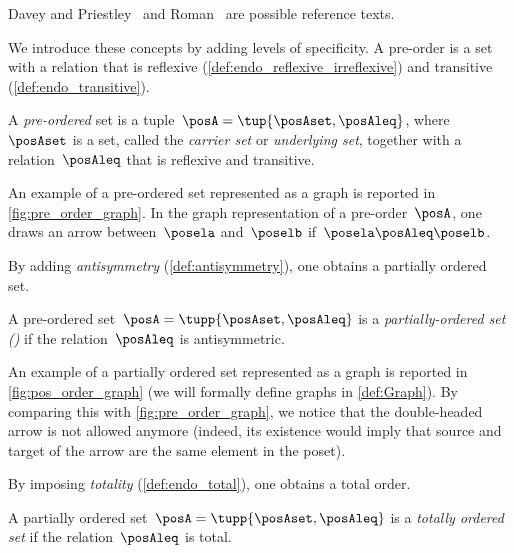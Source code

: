 Davey and Priestley~\cite{davey02} and Roman~\cite{roman08} are possible reference texts.

We introduce these concepts by adding levels of specificity.
A pre-order is a set with a relation that is reflexive (\cref{def:endo_reflexive_irreflexive}) and transitive (\cref{def:endo_transitive}).
\begin{ctdefinition}
    \label{def:preorder}
    A \emph{pre-ordered} set is a tuple~$\posA = \tup{\posAset,\posAleq}$, where~$\posAset$ is a set, called the \emph{carrier set} or \emph{underlying set}, together with a relation~$\posAleq$ that is
    reflexive and transitive.
\end{ctdefinition}
An example of a pre-ordered set represented as a graph is reported in \cref{fig:pre_order_graph}.
In the graph representation of a pre-order~$\posA$, one draws an arrow between~$\posela$ and~$\poselb$ if~$\posela \posAleq \poselb$.

\begin{marginfigure}
    \centering
    \caption{}
    \label{fig:pre_order_graph}
\end{marginfigure}

By adding \emph{antisymmetry} (\cref{def:antisymmetry}), one obtains a partially ordered set.
\begin{ctdefinition}
    \label{def:poset}
    A pre-ordered set~$\posA = \tupp{\posAset,\posAleq}$ is a \emph{partially-ordered set ()} if the relation~$\posAleq$ is antisymmetric.
\end{ctdefinition}

\begin{marginfigure}
    \centering
    \caption{}
    \label{fig:pos_order_graph}
\end{marginfigure}

An example of a partially ordered set represented as a graph is reported in \cref{fig:pos_order_graph} (we will formally define graphs in \cref{def:Graph}).
By comparing this with \cref{fig:pre_order_graph}, we notice that the double-headed arrow is not allowed anymore (indeed, its existence would imply that source and target of the arrow are the same element in the poset).

By imposing \emph{totality} (\cref{def:endo_total}), one obtains a total order.

\begin{ctdefinition}
    \label{def:total_order}
    A partially ordered set~$\posA = \tupp{\posAset,\posAleq}$ is a \emph{totally ordered set} if the relation~$\posAleq$ is total.
\end{ctdefinition}

